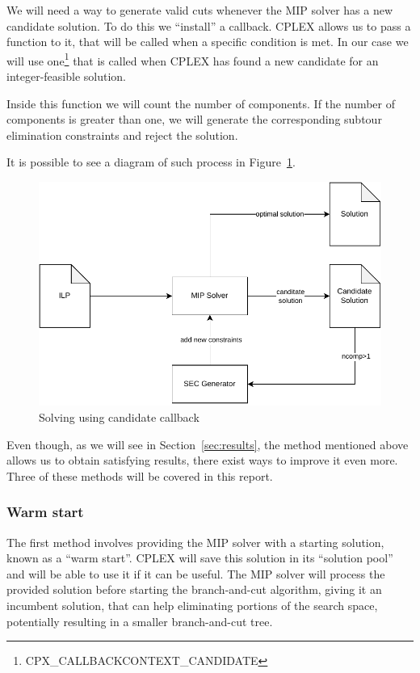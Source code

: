 \documentclass{article}
\begin{document}
We will need a way to generate valid cuts
whenever the MIP solver has a new candidate solution. To do this we ``install''
a callback. CPLEX allows us to pass a function to it, that will be called when
a specific condition is met. In our case we will use one\footnote{CPX\_CALLBACKCONTEXT\_CANDIDATE} that is called when CPLEX
has found a new candidate for an integer-feasible solution.

Inside this function we will count the number of components. If the number of
components is greater than one, we will generate the corresponding subtour
elimination constraints and reject the solution.

It is possible to see a diagram of such process in Figure~\ref{fig:callback}.

\begin{figure}[ht]
        \caption{Solving using candidate callback}
        \label{fig:callback}
        \centering
        \includegraphics[width=340pt]{assets/callback.drawio.pdf}
\end{figure}

\clearpage

Even though, as we will see in Section~\ref{sec:results}, the method mentioned
above allows us to obtain satisfying results, there exist ways to improve it
even more. Three of these methods will be covered in this report.

\subsubsection{Warm start}

The first method involves providing the MIP solver with a starting solution, known as a
``warm start''.
CPLEX will save this solution in its ``solution pool'' and will be able to use
it if it can be useful.
The MIP solver will process the provided solution before starting the branch-and-cut algorithm,
giving it an incumbent solution, that can help eliminating portions
of the search space, potentially resulting in a smaller branch-and-cut tree.
\end{document}
